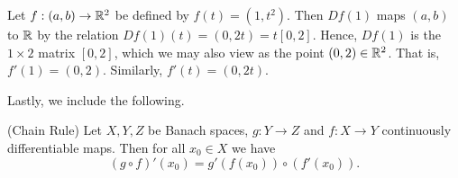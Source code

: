 \begin{framed}
\begin{example}
Let $f: (a,b) \to \mathbb{R}^2$ be defined by $f(t) = (1, t^2)$. Then $Df(1)$ maps
$(a,b)$ to $\mathbb{R}$ by the relation $Df(1)(t) = (0, 2t) = t[0, 2]$. Hence, $Df(1)$ is the $1
\times 2$ matrix $[0,2]$, which we may also view as the point $(0,2) \in \mathbb{R}^2$.
That is, $f'(1) = (0,2)$. Similarly, $f'(t) = (0,2t)$.
\end{example}
\end{framed}

Lastly, we include the following.
%
%
\begin{proposition}
		(Chain Rule) Let $X,Y,Z$ be Banach spaces, $g: Y \to Z$ and $f:
		X \to Y$ continuously differentiable maps. Then for all $x_0
		\in X$ we have \begin{equation*} (g \circ f)' (x_0) =
			g'(f(x_0)) \circ (f'(x_0)).
		\end{equation*} 
	\end{proposition}

